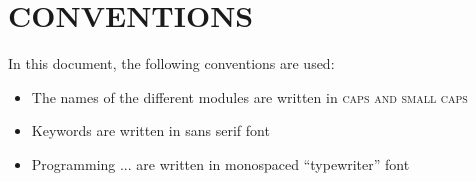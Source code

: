 \section{CONVENTIONS}
In this document, the following conventions are used:
\begin{itemize}
\item The names of the different modules are written in {\scshape caps and small caps }
\item Keywords are written in {\sffamily sans serif font} 
\item Programming ... are written in {\ttfamily monospaced ``typewriter'' font}
\end{itemize}